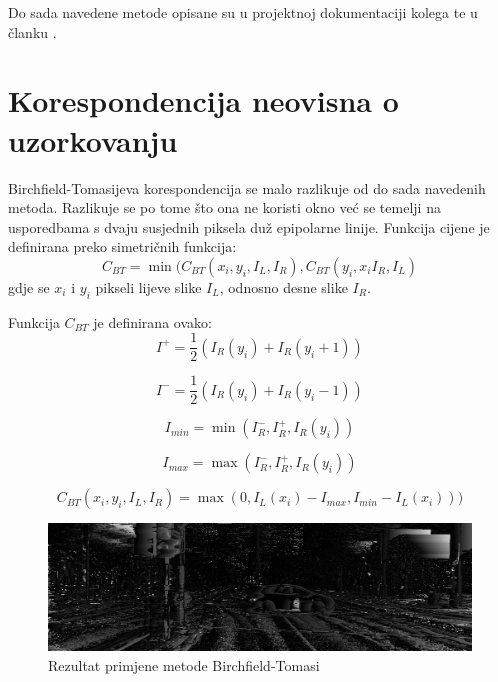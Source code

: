 \documentclass[utf8, zavrsni, numeric]{fer}
\begin{document}
Do sada navedene metode opisane su u projektnoj dokumentaciji kolega \cite{projekt1415} te u članku \cite{hirschmuller2007evaluation}.

\section{Korespondencija neovisna o uzorkovanju}

Birchfield-Tomasijeva korespondencija se malo razlikuje od do sada navedenih metoda.
Razlikuje se po tome što ona ne koristi okno već se temelji na usporedbama s dvaju susjednih piksela duž epipolarne linije.
Funkcija cijene je definirana preko simetričnih funkcija:
\[
C_{BT} = \min(C_{BT}(x_i, y_i, I_L, I_R), C_{BT}(y_i, x_i I_R, I_L)
\]
gdje se $x_i$ i $y_i$ pikseli lijeve slike $I_L$, odnosno desne slike $I_R$.

Funkcija $C_{BT}$ je definirana ovako:
\begin{equation}
I^+ = \frac{1}{2}(I_R(y_i) + I_R(y_i + 1))
\end{equation}

\begin{equation}
I^- = \frac{1}{2}(I_R(y_i) + I_R(y_i - 1))
\end{equation}

\begin{equation}
I_{min} = \min(I^-_R, I^+_R, I_R(y_i))
\end{equation}

\begin{equation}
I_{max} = \max(I^-_R, I^+_R, I_R(y_i))
\end{equation}

\begin{equation}
C_{BT}(x_i, y_i, I_L, I_R) = \max(0, I_L(x_i) - I_{max}, I_{min} - I_L(x_i)))
\end{equation}

\begin{figure}[htb]
  \centering
  \includegraphics[width=14cm]{img/local_000046_10_BT_1_140_scaled.png}
  \caption{Rezultat primjene metode Birchfield-Tomasi}
  \label{fig:BT-KITTI}
\end{figure}
\end{document}
